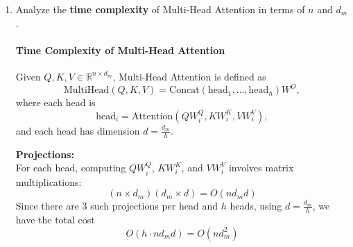 \documentclass[12pt,a4paper]{article}
\theoremstyle{definition}
\begin{document}
\begin{enumerate}
\begin{enumerate}
            \textbf{Compute $QK^T$:}
                $Q \in \mathbb{R}^{n \times d}$ and $K^T \in \mathbb{R}^{d \times n}$, so the cost is $O(n^2 d)$.
            
            \textbf{Scaling:}
                Dividing each element of the $n \times n$ matrix by $\sqrt{d}$ takes $O(n^2)$.
            
            \textbf{Softmax:}
                Applying softmax over an $n \times n$ matrix require $O(n^2)$.
            \textbf{Compute $AV$:}
                $A \in \mathbb{R}^{n \times n}$ and $V \in \mathbb{R}^{n \times d}$, so the multiplication cost is $O(n^2 d)$.

            \vspace{4pt}
            
            \textbf{Final Complexity:} Summing all terms:
            \[
            O(n^2 d) + O(n^2) + O(n^2) + O(n^2 d) = O(n^2 d).
            \]
            
            \[
            \boxed{O(n^2 d)}
            \]
            
            The main cost comes from the two matrix multiplications $QK^T$ and $AV$, with each requiring $O(n^2 d)$ operations.
    
        \item Analyze the \textbf{time complexity} of Multi-Head Attention in terms of $n$ and $d_{m}$. 
        
        {\color{blue}{(Detailed explanation required)}}
        
        {}

        \paragraph{Time Complexity of Multi-Head Attention}

            Given $Q, K, V \in \mathbb{R}^{n \times d_m}$, Multi-Head Attention is defined as
            \[
            \text{MultiHead}(Q, K, V) = \text{Concat}(\text{head}_1, \dots, \text{head}_h) W^O,
            \]
            where each head is
            \[
            \text{head}_i = \text{Attention}(QW_i^Q, KW_i^K, VW_i^V),
            \]
            and each head has dimension $d = \frac{d_m}{h}$.
            
            \textbf{Projections:} \\
                For each head, computing $QW_i^Q$, $KW_i^K$, and $VW_i^V$ involves matrix multiplications:
                \[
                (n \times d_m)(d_m \times d) = O(n d_m d)
                \]
                Since there are 3 such projections per head and $h$ heads, using $d = \frac{d_m}{h}$, we have the total cost
                \[
                O(h \cdot n d_m d) = O(n d_m^2)
                \]
            

\end{enumerate}
\end{enumerate}
\end{document}
